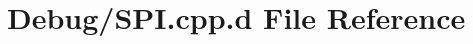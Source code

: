 \hypertarget{_debug_2_s_p_i_8cpp_8d}{\section{\-Debug/\-S\-P\-I.cpp.\-d \-File \-Reference}
\label{_debug_2_s_p_i_8cpp_8d}
}
